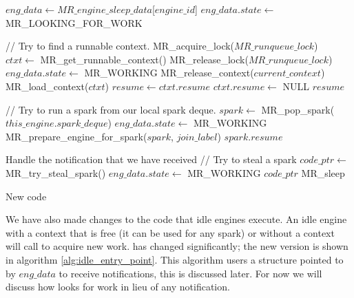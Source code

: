 \begin{algorithm}[tbp]
\begin{algorithmic}[1]
        \State $eng\_data \gets MR\_engine\_sleep\_data$[$engine\_id$]
        \State $eng\_data.state \gets$ MR\_LOOKING\_FOR\_WORK

        \State \State // Try to find a runnable context.
        \State MR\_acquire\_lock($MR\_runqueue\_lock$)
        \State $ctxt \gets$ MR\_get\_runnable\_context()
        \State MR\_release\_lock($MR\_runqueue\_lock$)
            \State $eng\_data.state \gets$ MR\_WORKING
                \State MR\_release\_context($current\_context$)
            \EndIf
            \State MR\_load\_context($ctxt$)
            \State $resume \gets ctxt.resume$
            \State $ctxt.resume \gets$ NULL
            \Goto $resume$
        \EndIf
       
        \State \State // Try to run a spark from our local spark deque.
        \State $spark \gets$ MR\_pop\_spark($this\_engine.spark\_deque$)
            \State $eng\_data.state \gets$ MR\_WORKING
            \State MR\_prepare\_engine\_for\_spark($spark$, $join\_label$)
            \Goto $spark.resume$
        \EndIf

        \State
            \State Handle the notification that we have received
        \EndIf
        \State // Try to steal a spark
        \State $code\_ptr \gets$ MR\_try\_steal\_spark()
            \State $eng\_data.state \gets$ MR\_WORKING
            \Goto $code\_ptr$
        \EndIf
        \Goto MR\_sleep
    \EndProcedure
\end{algorithmic}
\caption{New \idle code}
\label{alg:idle_entry_point}
\end{algorithm}

We have also made changes to the code that idle engines execute.
An idle engine with a context that is free (it can be used for any spark) or
without a context will call \idle to acquire new work.
\idle has changed significantly;
the new version is shown in algorithm \ref{alg:idle_entry_point}.
This algorithm users a structure pointed to by $eng\_data$ to receive
notifications,
this is discussed later.
For now we will discuss how \idle looks for work in lieu of any notification.

